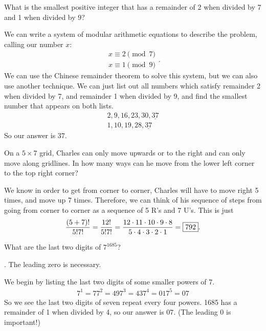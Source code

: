 \documentclass[11pt]{article}
\DeclareRobustCommand{\frac}[3][0pt]{%
  {\begingroup\hspace{#1}#2\hspace{#1}\endgroup\over\hspace{#1}#3\hspace{#1}}}
\begin{document}

\begin{problem}What is the smallest positive integer that has a remainder of 2 when divided by 7 and 1 when divided by 9?
\end{problem}
\begin{answer}
\end{answer}
\begin{solution}
We can write a system of modular arithmetic equations to describe the problem, calling our number $x$:
$$ \begin{array}{ll}
              	x \equiv 2 \pmod{7}\\
              	x \equiv 1 \pmod{9}
            	\end{array}
.
$$
We can use the Chinese remainder theorem to solve this system, but we can also use another technique. We can just list out all numbers which satisfy remainder 2 when divided by 7, and remainder 1 when divided by 9, and find the smallest number that appears on both lists.
\begin{align*}
2, 9, 16, 23, 30, \underline{37} \\
1, 10, 19, 28, \underline{37}
\end{align*}
So our answer is $\boxed{37}$.
\end{solution}

\begin{problem}On a $5 \times 7$ grid, Charles can only move upwards or to the right and can only move along gridlines. In how many ways can he move from the lower left corner to the top right corner?
\end{problem}
\begin{answer}
\end{answer}
\begin{solution}
We know in order to get from corner to corner, Charles will have to move right 5 times, and move up 7 times. Therefore, we can think of his sequence of steps from going from corner to corner as a sequence of 5 R's and 7 U's. This is just
$$\frac{(5+7)!}{5!7!}=\frac{12!}{5!7!} = \frac{12 \cdot 11 \cdot 10 \cdot 9 \cdot 8}{5 \cdot 4 \cdot 3 \cdot 2 \cdot 1} = \boxed{792}.$$
\end{solution}

\begin{problem}What are the last two digits of $7^{1685}$?
\end{problem}
\begin{answer}
. The leading zero is necessary.
\end{answer}
\begin{solution}
We begin by listing the last two digits of some smaller powers of 7.
\begin{align*}
7^1 = 7
7^2 = 49
7^3 = 43
7^4 = 01
7^5 = 07
\end{align*}
So we see the last two digits of seven repeat every four powers. 1685 has a remainder of 1 when divided by 4, so our answer is $\boxed{07}$. (The leading 0 is important!)
\end{solution}
\end{document}
